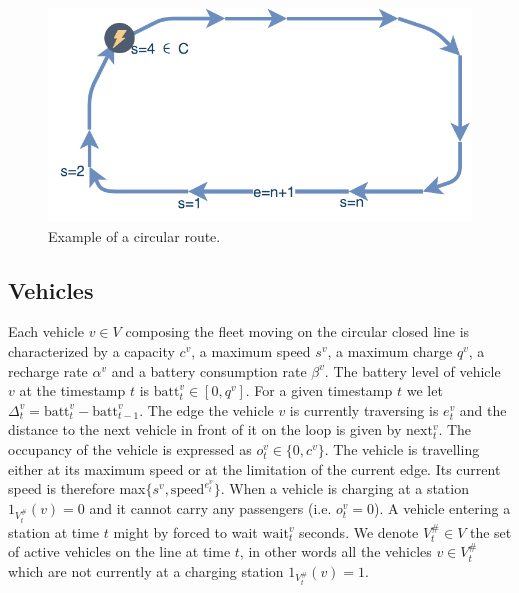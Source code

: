 \documentclass[12pt,a4paper]{article}
\begin{document}
\begin{figure} 
  \centering
\includegraphics[scale=0.7]{./images/loop.pdf}
\caption{Example of a circular route.}
\label{fig:route}
\end{figure}

\subsection{Vehicles}\label{vehicles}
Each vehicle $v \in V$ composing the fleet  moving on the circular closed line is characterized by a capacity $c^{v}$, a maximum speed $s^{v}$, a maximum charge $q^{v}$, a recharge rate $\alpha^{v}$ and a battery consumption rate $\beta^{v}$. The battery level of vehicle $v$ at the timestamp $t$ is $\text{batt}^{v}_{t} \in [0, q^{v}]$. For a given timestamp $t$ we let $\Delta^{v}_{t} = \text{batt}^{v}_{t} - \text{batt}^{v}_{t-1}$. The edge the vehicle $v$ is currently traversing is $e^{v}_{t}$ and the distance to the next vehicle in front of it on the loop is given by $\text{next}^{v}_{t}$. The occupancy of the vehicle is expressed as $o^{v}_{t} \in \{0, c^{v}\}$. The vehicle is travelling either at its maximum speed or at the limitation of the current edge. Its current speed is therefore max$\{s^{v}, \text{speed}^{e^{v}_{t}}\}$. When a vehicle is charging at a station $1_{V^{\#}_{t}}(v) = 0$ and it cannot carry any passengers (i.e. $o^{v}_{t} = 0$). A vehicle entering a station at time $t$ might by forced to wait $\text{wait}^{v}_{t}$ seconds. We denote $V^{\#}_{t} \in V$ the set of active vehicles on the line at time $t$, in other words all the vehicles $v \in V^{\#}_{t}$  which are not currently at a charging station $ 1_{V^{\#}_{t}}(v) = 1$. 
\end{document}

